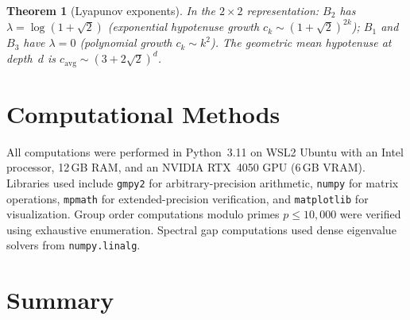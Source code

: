 \documentclass[12pt]{amsart}
\newtheorem{theorem}{Theorem}[section]
\theoremstyle{definition}
\theoremstyle{remark}
\begin{document}
\begin{theorem}[Lyapunov exponents]\label{thm:lyapunov}
In the $2 \times 2$ representation: $B_2$ has $\lambda = \log(1 + \sqrt{2})$
(exponential hypotenuse growth $c_k \sim (1+\sqrt{2})^{2k}$); $B_1$ and
$B_3$ have $\lambda = 0$ (polynomial growth $c_k \sim k^2$). The geometric
mean hypotenuse at depth~$d$ is $c_{\mathrm{avg}} \sim (3 + 2\sqrt{2})^d$.
\end{theorem}


\section{Computational Methods}\label{sec:computational}

All computations were performed in Python~3.11 on WSL2 Ubuntu with an
Intel processor, 12\,GB RAM, and an NVIDIA RTX~4050 GPU (6\,GB VRAM).
Libraries used include \texttt{gmpy2} for arbitrary-precision arithmetic,
\texttt{numpy} for matrix operations, \texttt{mpmath} for extended-precision
verification, and \texttt{matplotlib} for visualization. Group order
computations modulo primes $p \le 10{,}000$ were verified using exhaustive
enumeration. Spectral gap computations used dense eigenvalue solvers from
\texttt{numpy.linalg}.


\section{Summary}\label{sec:summary}
\end{document}
